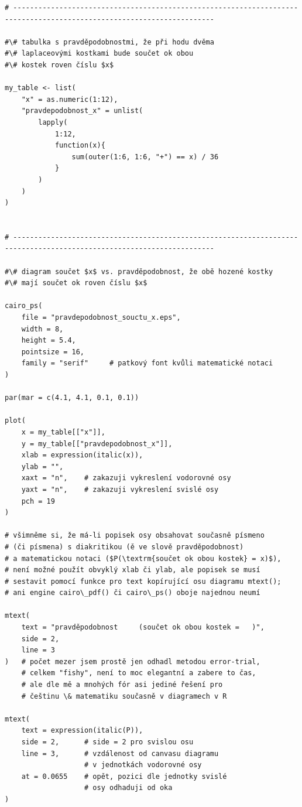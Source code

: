\documentclass{article}
\begin{document}
\begin{lstlisting}[style = custom_R]
# ----------------------------------------------------------------------------------------------------------------------

#\# tabulka s pravděpodobnostmi, že při hodu dvěma
#\# laplaceovými kostkami bude součet ok obou
#\# kostek roven číslu $x$

my_table <- list(
    "x" = as.numeric(1:12),
    "pravdepodobnost_x" = unlist(
        lapply(
            1:12,
            function(x){
                sum(outer(1:6, 1:6, "+") == x) / 36
            }
        )
    )
)


# ----------------------------------------------------------------------------------------------------------------------

#\# diagram součet $x$ vs. pravděpodobnost, že obě hozené kostky
#\# mají součet ok roven číslu $x$

cairo_ps(
    file = "pravdepodobnost_souctu_x.eps",
    width = 8,
    height = 5.4,
    pointsize = 16,
    family = "serif"     # patkový font kvůli matematické notaci
)

par(mar = c(4.1, 4.1, 0.1, 0.1))

plot(
    x = my_table[["x"]],
    y = my_table[["pravdepodobnost_x"]],
    xlab = expression(italic(x)),
    ylab = "",
    xaxt = "n",    # zakazuji vykreslení vodorovné osy
    yaxt = "n",    # zakazuji vykreslení svislé osy
    pch = 19
)

# všimněme si, že má-li popisek osy obsahovat současně písmeno
# (či písmena) s diakritikou (ě ve slově pravděpodobnost)
# a matematickou notaci ($P(\textrm{součet ok obou kostek} = x)$),
# není možné použít obvyklý xlab či ylab, ale popisek se musí
# sestavit pomocí funkce pro text kopírující osu diagramu mtext();
# ani engine cairo\_pdf() či cairo\_ps() oboje najednou neumí

mtext(
    text = "pravděpodobnost     (součet ok obou kostek =   )",
    side = 2,
    line = 3
)   # počet mezer jsem prostě jen odhadl metodou error-trial,
    # celkem "fishy", není to moc elegantní a zabere to čas,
    # ale dle mě a mnohých fór asi jediné řešení pro
    # češtinu \& matematiku současně v diagramech v R

mtext(
    text = expression(italic(P)),
    side = 2,      # side = 2 pro svislou osu
    line = 3,      # vzdálenost od canvasu diagramu
                   # v jednotkách vodorovné osy
    at = 0.0655    # opět, pozici dle jednotky svislé
                   # osy odhaduji od oka
)


\end{lstlisting}
\end{document}
